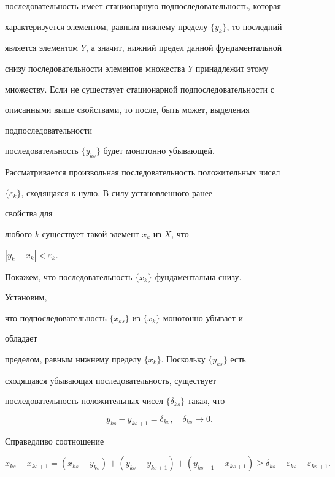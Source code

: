 \begin{pf}
последовательность имеет стационарную подпоследовательность, которая 


характеризуется элементом, равным нижнему пределу $\{y_k\}$, то последний 


является элементом $Y$, а значит, нижний предел данной фундаментальной 


снизу последовательности элементов множества $Y$ принадлежит этому 


множеству. Если не существует стационарной подпоследовательности с 


описанными выше свойствами, то после, быть может, выделения 


подпоследовательности


последовательность $\{y_{ks}\}$ будет монотонно убывающей. 


 


Рассматривается произвольная последовательность положительных чисел 


$\{\varepsilon_k\}$, сходящаяся к нулю. В силу установленного ранее 


свойства для 


любого $k$ существует такой элемент $x_k$ из $X$, что 


$|y_k-x_k|<\varepsilon_k$. 


Покажем, что последовательность $\{x_k\}$ фундаментальна снизу. 


Установим, 


что подпоследовательность $\{x_{ks}\}$ из $\{x_k\}$ монотонно убывает и 


обладает 


пределом, равным нижнему пределу $\{x_k\}$. Поскольку $\{y_{ks}\}$ есть 


сходящаяся убывающая последовательность, существует 


последовательность положительных чисел $\{\delta_{ks}\}$ такая, что 


$$ 


y_{ks}-y_{ks+1}=\delta_{ks},\quad \delta_{ks}\to0. 


$$ 


Справедливо соотношение 


$$ 


x_{ks}-x_{ks+1}=(x_{ks}-y_{ks})+(y_{ks}-y_{ks+1}) 


+(y_{ks+1}-x_{ks+1})\ge\delta_{ks}- 


\varepsilon_{ks}-\varepsilon_{ks+1}. 


$$ 



\end{pf}
